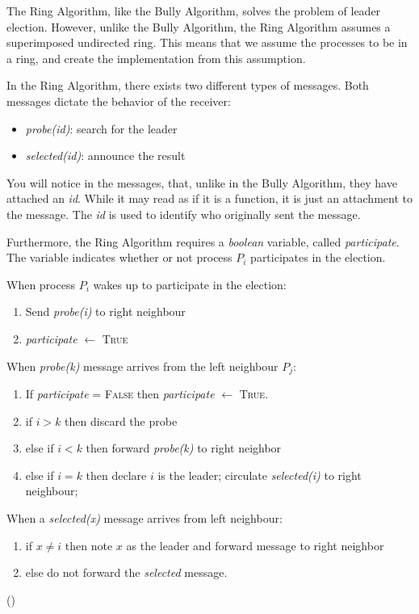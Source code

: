 \documentclass{report}
\begin{document}
The Ring Algorithm, like the Bully Algorithm, solves the problem of leader election. However, unlike the Bully Algorithm, the Ring Algorithm assumes a superimposed undirected ring. This means that we assume the processes to be in a ring, and create the implementation from this assumption.

In the Ring Algorithm, there exists two different types of messages. Both messages dictate the behavior of the receiver:
\begin{itemize}
  \item \textit{probe(id)}: search for the leader
  \item \textit{selected(id)}: announce the result
\end{itemize}

You will notice in the messages, that, unlike in the Bully Algorithm, they have attached an \textit{id}. While it may read as if it is a function, it is just an attachment to the message. The \textit{id} is used to identify who originally sent the message.

Furthermore, the Ring Algorithm requires a \textit{boolean} variable, called \textit{participate}. The variable indicates whether or not process $P_{i}$ participates in the election.

\noindent
When process $P_{i}$ wakes up to participate in the election:
\begin{enumerate}
  \item Send \textit{probe(i)} to right neighbour
        \item \textit{participate } $\leftarrow $ \textsc{True}
\end{enumerate}

\noindent
When \textit{probe(k)} message arrives from the left neighbour $P_{j}$:
\begin{enumerate}
  \item If \textit{participate} = \textsc{False} then \textit{participate} $\leftarrow$ \textsc{True}.
  \item if $i > k$ then discard the probe
  \item else if $i < k$ then forward \textit{probe(k)} to right neighbor
  \item else if $i = k$ then declare $i$ is the leader; circulate \textit{selected(i)} to right neighbour;
\end{enumerate}

\noindent
When a \textit{selected(x)} message arrives from left neighbour:
\begin{enumerate}
  \item if $x \neq i$ then note $x$ as the leader and forward message to right neighbor
        \item else do not forward the \textit{selected} message.
\end{enumerate}
(\cite{kshemkalyani2011distributed})
\end{document}
